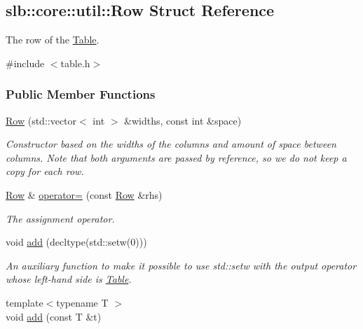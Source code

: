 \hypertarget{structslb_1_1core_1_1util_1_1Row}{}\subsection{slb\+:\+:core\+:\+:util\+:\+:Row Struct Reference}
\label{structslb_1_1core_1_1util_1_1Row}


The row of the \hyperlink{structslb_1_1core_1_1util_1_1Table}{Table}.  




{\ttfamily \#include $<$table.\+h$>$}

\subsubsection*{Public Member Functions}
\begin{DoxyCompactItemize}
\item 
\hyperlink{structslb_1_1core_1_1util_1_1Row_af8b957c8eb60ef93641d7d0df5c491ec}{Row} (std\+::vector$<$ int $>$ \&widths, const int \&space)
\begin{DoxyCompactList}\small\item\em Constructor based on the widths of the columns and amount of space between columns. Note that both arguments are passed by reference, so we do not keep a copy for each row. \end{DoxyCompactList}\item 
\hyperlink{structslb_1_1core_1_1util_1_1Row}{Row} \& \hyperlink{structslb_1_1core_1_1util_1_1Row_a70b2788055360092659e312ad224f8d1}{operator=} (const \hyperlink{structslb_1_1core_1_1util_1_1Row}{Row} \&rhs)
\begin{DoxyCompactList}\small\item\em The assignment operator. \end{DoxyCompactList}\item 
void \hyperlink{structslb_1_1core_1_1util_1_1Row_a07135d4d128f05bd99d21de1f1a31b15}{add} (decltype(std\+::setw(0)))\hypertarget{structslb_1_1core_1_1util_1_1Row_a07135d4d128f05bd99d21de1f1a31b15}{}\label{structslb_1_1core_1_1util_1_1Row_a07135d4d128f05bd99d21de1f1a31b15}

\begin{DoxyCompactList}\small\item\em An auxiliary function to make it possible to use {\ttfamily std\+::setw} with the output operator whose left-\/hand side is \hyperlink{structslb_1_1core_1_1util_1_1Table}{Table}. \end{DoxyCompactList}\item 
{\footnotesize template$<$typename T $>$ }\\void \hyperlink{structslb_1_1core_1_1util_1_1Row_a1a718285cef2a4489be6ec5c1ffc14a4}{add} (const T \&t)\hypertarget{structslb_1_1core_1_1util_1_1Row_a1a718285cef2a4489be6ec5c1ffc14a4}{}\label{structslb_1_1core_1_1util_1_1Row_a1a718285cef2a4489be6ec5c1ffc14a4}


\end{DoxyCompactItemize}
